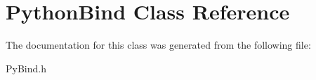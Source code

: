 \hypertarget{classPythonBind}{}\section{Python\+Bind Class Reference}
\label{classPythonBind}


The documentation for this class was generated from the following file\+:\begin{DoxyCompactItemize}
\item 
Py\+Bind.\+h\end{DoxyCompactItemize}

